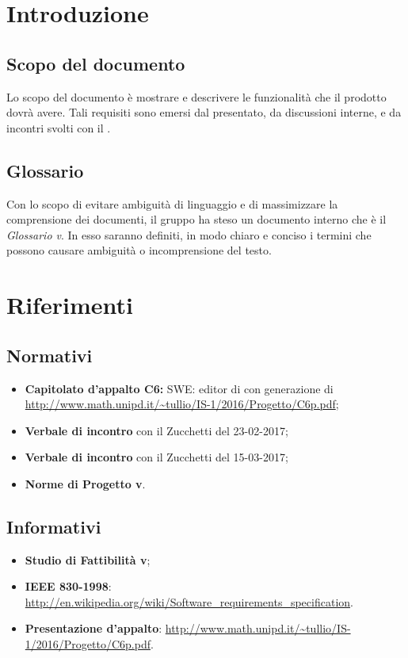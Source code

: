 \section{Introduzione}
\subsection{Scopo del documento}
Lo scopo del documento è mostrare e descrivere le funzionalità che il prodotto dovrà avere. Tali requisiti sono emersi dal  presentato, da discussioni interne, e da incontri svolti con il .

\subsection{Glossario}
          Con lo scopo di evitare ambiguità di linguaggio e di massimizzare la comprensione dei documenti, il
          gruppo ha steso un documento interno che è il \emph{Glossario v\VersioneG{}}. In esso saranno definiti, in modo
          chiaro e conciso i termini che possono causare ambiguità o incomprensione del testo.
  \newpage        
\section{Riferimenti}
\subsection{Normativi}
\begin{itemize}
\item \textbf{Capitolato d'appalto C6:} SWE: editor di   con generazione di  \\
\url{http://www.math.unipd.it/~tullio/IS-1/2016/Progetto/C6p.pdf};
\item \textbf{Verbale di incontro} con il  Zucchetti del 23-02-2017;
\item \textbf{Verbale di incontro} con il  Zucchetti del 15-03-2017;
\item \textbf{Norme di Progetto v\VersioneNP{}}.
\end{itemize}
\subsection{Informativi}
\begin{itemize}
\item \textbf{Studio di Fattibilità v\VersioneSF{}};
\item \textbf{IEEE 830-1998}: \url{http://en.wikipedia.org/wiki/Software_requirements_specification}.
\item \textbf{Presentazione  d'appalto}: \url{http://www.math.unipd.it/~tullio/IS-1/2016/Progetto/C6p.pdf}.
\end{itemize}
\newpage
